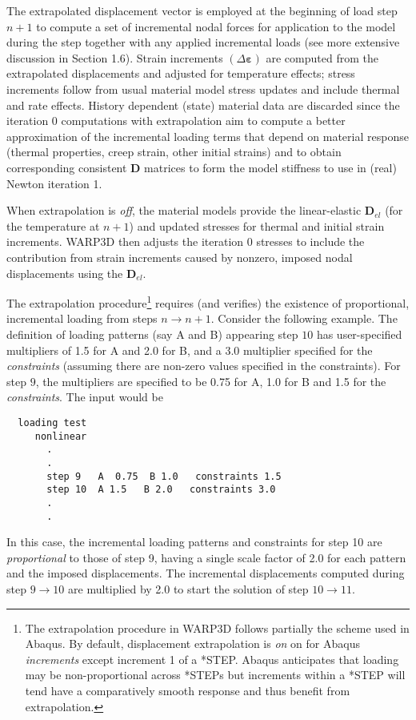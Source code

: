 \documentclass[11pt]{report}
\numberwithin{equation}{section}
\newcommand{\bmf } {\boldsymbol }  %
\newcommand{\ti}{\emph}
\newcommand{\veps}{\varepsilon}
\begin{document}
The extrapolated displacement vector is employed at the beginning of load step $n+1$ to compute 
a set of incremental nodal forces for application to the model  during the step
together with any applied incremental loads (see more extensive discussion in
Section 1.6).  Strain increments 
$(\Delta \bmf{\veps})$ are computed from the extrapolated displacements and adjusted
for temperature effects;  stress increments follow from usual material model
stress updates and include thermal and rate effects. History dependent (state) material data are discarded
since the iteration 0 computations with extrapolation aim to
 compute a better approximation of the incremental loading terms that depend
 on material response (thermal properties, creep strain, other initial strains) and to
 obtain  corresponding consistent $\mathbf{D}$ matrices to form the 
 model stiffness to use in (real) Newton iteration 1.
 
 When extrapolation is \ti{off}, the material models provide the linear-elastic 
 $\mathbf{D}_{el}$ (for the temperature at $n+1$) and updated stresses for thermal and initial
 strain increments. WARP3D then adjusts the
 iteration 0  stresses to include the contribution from strain increments caused by
 nonzero, imposed nodal displacements using the  $\mathbf{D}_{el}$.
 

The extrapolation procedure\footnote{The extrapolation procedure 
in WARP3D follows partially the scheme used in Abaqus.
By default, displacement extrapolation is \ti{on} on for Abaqus \ti{increments} except increment 1 of
a *STEP.  Abaqus anticipates that loading may be non-proportional across *STEPs but
increments within a *STEP will tend have a comparatively smooth response and thus
benefit from extrapolation.}
 requires (and verifies) the existence of proportional,
incremental loading from steps $n \rightarrow n+1$. Consider the following
example. The definition of loading patterns (say A and B) appearing step $10$ has user-specified
multipliers of 1.5 for A and 2.0 for B, and a 3.0 multiplier specified for the
\ti{constraints} (assuming there are non-zero values specified in the constraints).
For step $9$, the multipliers are specified to be 0.75 for A,
1.0 for B and 1.5 for the \ti{constraints}.  The input would be

\small
\begin{verbatim}
  loading test
     nonlinear
       .
       .
       step 9   A  0.75  B 1.0   constraints 1.5
       step 10  A 1.5   B 2.0   constraints 3.0
       .
       .
\end{verbatim}
\normalsize
In this case, the incremental loading patterns
and constraints for step 10 are \ti{proportional} to those of step 9, having a
single scale factor of 2.0 for each pattern and the imposed
displacements. The incremental displacements computed during step $9\rightarrow 10$
are multiplied by 2.0 to start the solution of step $10 \rightarrow 11$. 
\end{document}

